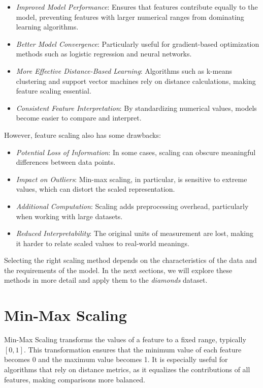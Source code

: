 \documentclass[
  11pt,
]{book}
\providecommand{\tightlist}{%
  \setlength{\itemsep}{0pt}\setlength{\parskip}{0pt}}
\theoremstyle{definition}
\theoremstyle{definition}
\theoremstyle{definition}
\theoremstyle{definition}
\theoremstyle{remark}
\begin{document}
\begin{itemize}
\tightlist
\item
  \emph{Improved Model Performance}: Ensures that features contribute equally to the model, preventing features with larger numerical ranges from dominating learning algorithms.
\item
  \emph{Better Model Convergence}: Particularly useful for gradient-based optimization methods such as logistic regression and neural networks.
\item
  \emph{More Effective Distance-Based Learning}: Algorithms such as k-means clustering and support vector machines rely on distance calculations, making feature scaling essential.
\item
  \emph{Consistent Feature Interpretation}: By standardizing numerical values, models become easier to compare and interpret.
\end{itemize}

However, feature scaling also has some drawbacks:

\begin{itemize}
\tightlist
\item
  \emph{Potential Loss of Information}: In some cases, scaling can obscure meaningful differences between data points.
\item
  \emph{Impact on Outliers}: Min-max scaling, in particular, is sensitive to extreme values, which can distort the scaled representation.
\item
  \emph{Additional Computation}: Scaling adds preprocessing overhead, particularly when working with large datasets.
\item
  \emph{Reduced Interpretability}: The original units of measurement are lost, making it harder to relate scaled values to real-world meanings.
\end{itemize}

Selecting the right scaling method depends on the characteristics of the data and the requirements of the model. In the next sections, we will explore these methods in more detail and apply them to the \emph{diamonds} dataset.

\section{Min-Max Scaling}\label{min-max-scaling}

Min-Max Scaling transforms the values of a feature to a fixed range, typically \([0, 1]\). This transformation ensures that the minimum value of each feature becomes 0 and the maximum value becomes 1. It is especially useful for algorithms that rely on distance metrics, as it equalizes the contributions of all features, making comparisons more balanced.
\end{document}
